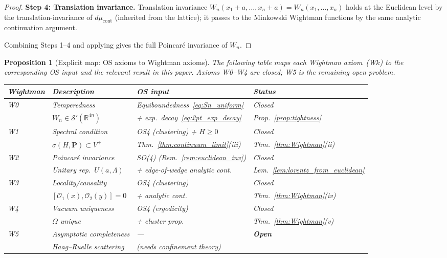 \documentclass[11pt,a4paper]{amsart}
\newtheorem{proposition}[theorem]{Proposition}
\theoremstyle{definition}
\newcommand{\R}{\mathbb{R}}
\begin{document}
\begin{proof}
\textbf{Step 4: Translation invariance.}
Translation invariance $W_n(x_1+a,\ldots,x_n+a) = W_n(x_1,\ldots,x_n)$
holds at the Euclidean level by the translation-invariance of $d\mu_{\mathrm{cont}}$
(inherited from the lattice); it passes to the Minkowski Wightman functions
by the same analytic continuation argument.

Combining Steps 1--4 and applying \cite[Thm.~3.3]{OS75} gives the full
Poincaré invariance of $W_n$.
\end{proof}

\begin{proposition}[Explicit map: OS axioms to Wightman axioms]
\label{prop:wightman_map}
The following table maps each Wightman axiom~(W$k$) to the corresponding
OS input and the relevant result in this paper.  Axioms W0--W4 are closed;
W5 is the remaining open problem.

\begin{center}
\renewcommand{\arraystretch}{1.3}
\begin{tabular}{llll}
\hline
Wightman & Description & OS input & Status \\
\hline
W0 & Temperedness & Equiboundedness~\eqref{eq:Sn_uniform} & Closed \\
   & $W_n \in \mathcal{S}'(\R^{4n})$ & + exp.\ decay~\eqref{eq:2pt_exp_decay} & Prop.~\ref{prop:tightness} \\
W1 & Spectral condition & OS4 (clustering) + $H \ge 0$ & Closed \\
   & $\sigma(H,\mathbf{P})\subset\overline{V^+}$ & Thm.~\ref{thm:continuum_limit}(iii) & Thm.~\ref{thm:Wightman}(ii) \\
W2 & Poincaré invariance & SO(4) (Rem.~\ref{rem:euclidean_inv}) & Closed \\
   & Unitary rep.\ $U(a,\Lambda)$ & + edge-of-wedge analytic cont. & Lem.~\ref{lem:lorentz_from_euclidean} \\
W3 & Locality/causality & OS4 (clustering) & Closed \\
   & $[\mathcal{O}_1(x),\mathcal{O}_2(y)]=0$ & + analytic cont.\ & Thm.~\ref{thm:Wightman}(iv) \\
W4 & Vacuum uniqueness & OS4 (ergodicity) & Closed \\
   & $\Omega$ unique & + cluster prop.\ & Thm.~\ref{thm:Wightman}(v) \\
\hline
W5 & Asymptotic completeness & \emph{---} & \textbf{Open} \\
   & Haag--Ruelle scattering & (needs confinement theory) & \\
\hline
\end{tabular}
\end{center}


\end{proposition}
\end{document}
